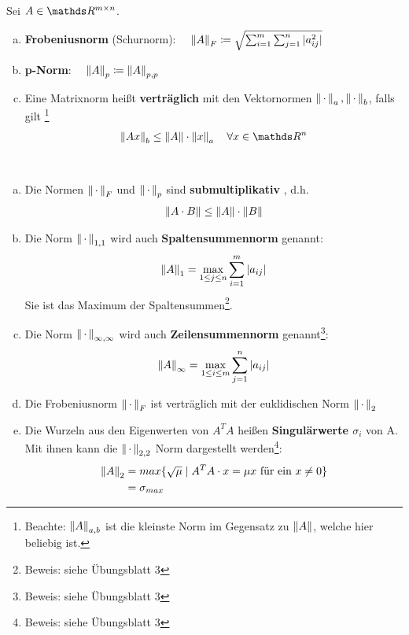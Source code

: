 \begin{Defe}
  \label{3.2.5}
  Sei $A\in \R^{m\times n}$.
  \begin{enumerate}[a)]
  \item \textbf{Frobeniusnorm} (Schurnorm):
    $ \quad \nn{A}_F \coloneqq \sqrt{\sum_{i=1}^{m}\sum_{j=1}^{n}|a_{ij}^2|}
    \index{Norm!Frobeniusnorm}$
  \item \textbf{p-Norm}: 
    $\quad \nn{A}_p \coloneqq \nn{A}_{p,p}
    \index{p-Norm}$
  \item Eine Matrixnorm heißt \textbf{verträglich}  mit den Vektornormen 
    $\left\| \,\cdot\, \right\|_a, \left\| \,\cdot\, \right\|_b$, falls gilt
    \footnote{ Beachte: $\left\| A \right\|_{a,b}$ ist die kleinste Norm im Gegensatz zu $\left\| A \right\|$, welche hier beliebig ist.}
    \begin{gather*}
      \nn{Ax}_b \leq \nn{A}\cdot \nn{x}_a \quad \forall x\in \R^n
    \end{gather*}
  \end{enumerate}
\end{Defe}
\begin{Beme}~
  \label{3.2.6}
  \begin{enumerate}[a)]
  \item Die Normen $\left\| \,\cdot\, \right\|_F$ und $\left\| \,\cdot\, \right\|_p$ sind \textbf{submultiplikativ} , d.h.
    \begin{gather*}
      \left\| A\cdot B \right\| \leq \left\| A \right\|\cdot\left\| B \right\|
    \end{gather*}
  \item Die Norm $\left\| \,\cdot\, \right\|_{1,1}$ wird auch \textbf{Spaltensummennorm} genannt:
    \begin{gather*}
      \left\| A \right\|_1 = \max_{1\leq j \leq n}\sum_{i=1}^{m}|a_{ij}|
    \end{gather*}
    Sie ist das Maximum der Spaltensummen\footnote{Beweis: siehe Übungsblatt 3}.
  \item Die Norm $\left\| \,\cdot\, \right\|_{\infty, \infty}$ wird auch \textbf{Zeilensummennorm} 
    genannt\footnote{Beweis: siehe Übungsblatt 3}:
    \begin{gather*}
      \left\| A \right\|_\infty = \max_{1\leq i \leq m}\sum_{j=1}^{n}|a_{ij}|
    \end{gather*}
  \item Die Frobeniusnorm $\left\| \,\cdot\, \right\|_F$ ist verträglich mit der euklidischen Norm $\left\| \,\cdot\, \right\|_2$
  \item Die Wurzeln aus den Eigenwerten von $A^TA$ heißen \textbf{Singulärwerte $\sigma_i$}  von A.
    Mit ihnen kann die $\left\| \,\cdot\, \right\|_{2,2}$ Norm dargestellt werden\footnote{Beweis: siehe Übungsblatt 3}:
    \begin{align*}
      \left\| A \right\|_2 &= max \{\sqrt{\mu} \mid A^TA\cdot x = \mu x\text{ für ein }x\neq 0 \} \\
               & = \sigma_{max}
    \end{align*}
  \end{enumerate}
\end{Beme}


